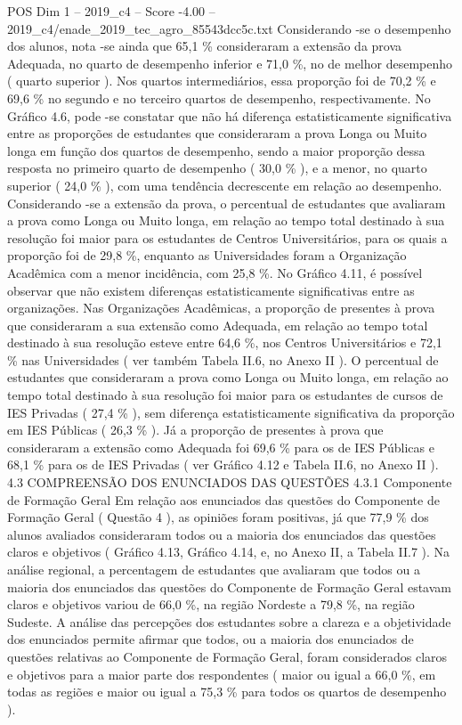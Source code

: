 \begin{textsample}{POS Dim 1 – 2019\_c4 – Score -4.00 – 2019\_c4/enade\_2019\_tec\_agro\_85543dcc5c.txt}
Considerando -se o desempenho dos alunos, nota -se ainda que 65,1 \% consideraram a extensão da prova Adequada, no quarto de desempenho inferior e 71,0 \%, no de melhor desempenho ( quarto superior ).
Nos quartos intermediários, essa proporção foi de 70,2 \% e 69,6 \% no segundo e no terceiro quartos de desempenho, respectivamente.
No Gráfico 4.6, pode -se constatar que não há diferença estatisticamente significativa entre as proporções de estudantes que consideraram a prova Longa ou Muito longa em função dos quartos de desempenho, sendo a maior proporção dessa resposta no primeiro quarto de desempenho ( 30,0 \% ), e a menor, no quarto superior ( 24,0 \% ), com uma tendência decrescente em relação ao desempenho.
Considerando -se a extensão da prova, o percentual de estudantes que avaliaram a prova como Longa ou Muito longa, em relação ao tempo total destinado à sua resolução foi maior para os estudantes de Centros Universitários, para os quais a proporção foi de 29,8 \%, enquanto as Universidades foram a Organização Acadêmica com a menor incidência, com 25,8 \%.
No Gráfico 4.11, é possível observar que não existem diferenças estatisticamente significativas entre as organizações.
Nas Organizações Acadêmicas, a proporção de presentes à prova que consideraram a sua extensão como Adequada, em relação ao tempo total destinado à sua resolução esteve entre 64,6 \%, nos Centros Universitários e 72,1 \% nas Universidades ( ver também Tabela II.6, no Anexo II ).
O percentual de estudantes que consideraram a prova como Longa ou Muito longa, em relação ao tempo total destinado à sua resolução foi maior para os estudantes de cursos de IES Privadas ( 27,4 \% ), sem diferença estatisticamente significativa da proporção em IES Públicas ( 26,3 \% ).
Já a proporção de presentes à prova que consideraram a extensão como Adequada foi 69,6 \% para os de IES Públicas e 68,1 \% para os de IES Privadas ( ver Gráfico 4.12 e Tabela II.6, no Anexo II ). 4.3 COMPREENSÃO DOS ENUNCIADOS DAS QUESTÕES 4.3.1 Componente de Formação Geral Em relação aos enunciados das questões do Componente de Formação Geral ( Questão 4 ), as opiniões foram positivas, já que 77,9 \% dos alunos avaliados consideraram todos ou a maioria dos enunciados das questões claros e objetivos ( Gráfico 4.13, Gráfico 4.14, e, no Anexo II, a Tabela II.7 ).
Na análise regional, a percentagem de estudantes que avaliaram que todos ou a maioria dos enunciados das questões do Componente de Formação Geral estavam claros e objetivos variou de 66,0 \%, na região Nordeste a 79,8 \%, na região Sudeste.
A análise das percepções dos estudantes sobre a clareza e a objetividade dos enunciados permite afirmar que todos, ou a maioria dos enunciados de questões relativas ao Componente de Formação Geral, foram considerados claros e objetivos para a maior parte dos respondentes ( maior ou igual a 66,0 \%, em todas as regiões e maior ou igual a 75,3 \% para todos os quartos de desempenho ).

\end{textsample}
